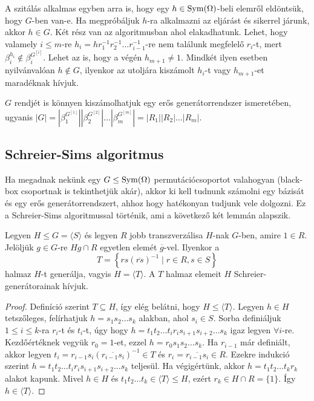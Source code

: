 A szitálás alkalmas egyben arra is, hogy egy $h \in \operatorname{Sym}(\Omega)$-beli elemről eldöntsük, hogy $G$-ben van-e.
Ha megpróbáljuk $h$-ra alkalmazni az eljárást és sikerrel járunk, akkor $h\in G$.
Két rész van az algoritmusban ahol elakadhatunk.
Lehet, hogy valamely $i \le m$-re $h_i = h r_1^{-1} r_2^{-1} \dots r_{i-1}^{-1}$-re nem találunk megfelelő $r_i$-t, mert $\beta_i^{h_i} \notin \beta_i^{G^{[i]}}$.
Lehet az is, hogy a végén $h_{m+1} \neq 1$.
Mindkét ilyen esetben nyilvánvalóan $h \notin G$, ilyenkor az utoljára kiszámolt $h_i$-t vagy $h_{m+1}$-et maradéknak hívjuk.

$G$ rendjét is könnyen kiszámolhatjuk egy erős generátorrendszer ismeretében, ugyanis $|G| = |\beta_1^{G^{[1]}}| |\beta_2^{G^{[2]}}| \dots |\beta_m^{G^{[m]}}| = |R_1| |R_2| \dots |R_m|$.

\subsection{Schreier-Sims algoritmus}
\label{subsec:permss}
Ha megadnak nekünk egy $G \le \operatorname{Sym}(\Omega)$ permutációcsoportot valahogyan (black-box csoportnak is tekinthetjük akár),
akkor ki kell tudnunk számolni egy bázisát és egy erős generátorrendszert, ahhoz hogy hatékonyan tudjunk vele dolgozni.
Ez a Schreier-Sims algoritmussal történik, ami a következő két lemmán alapszik.
\begin{lemma}[Schreier]
\label{thm:sims1}
Legyen $H \le G = \langle S \rangle$ és legyen $R$ jobb transzverzálisa $H$-nak $G$-ben, amire $1\in R$.
Jelöljük $g \in G$-re $Hg\cap R$ egyetlen elemét $\overline{g}$-vel.
Ilyenkor a
\begin{equation*}
T=\left\{ rs(\overline{rs})^{-1} \mid r\in R, s\in S \right\}
\end{equation*}
halmaz $H$-t generálja, vagyis $H=\langle T \rangle$. A $T$ halmaz elemeit $H$ Schreier-generátorainak hívjuk.
\end{lemma}
\begin{proof}
Definíció szerint $T \subseteq H$, így elég belátni, hogy $H \le \langle T \rangle$.
Legyen $h \in H$ tetszőleges, felírhatjuk $h = s_1 s_2 \dots s_k$ alakban, ahol $s_i \in S$.
Sorba definiáljuk $1 \le i \le k$-ra $r_i$-t és $t_i$-t, úgy hogy $h = t_1 t_2 \dots t_i r_i s_{i+1} s_{i+2} \dots s_k$ igaz legyen $\forall i$-re.
Kezdőértéknek vegyük $r_0=1$-et, ezzel $h = r_0 s_1 s_2 \dots s_k$.
Ha $r_{i-1}$ már definiált, akkor legyen $t_i=r_{i-1} s_i (\overline{r_{i-1} s_i})^{-1} \in T$ és $r_i = \overline{r_{i-1} s_i} \in R$.
Ezekre indukció szerint $h = t_1 t_2 \dots t_i r_i s_{i+1} s_{i+2} \dots s_k$ teljesül.
Ha végigértünk, akkor $h = t_1 t_2 \dots t_k r_k$ alakot kapunk.
Mivel $h \in H$ és $t_1 t_2 \dots t_k \in \langle T \rangle \le H$, ezért $r_k \in H\cap R = \{1\}$.
Így $h \in \langle T \rangle$.
\end{proof}
